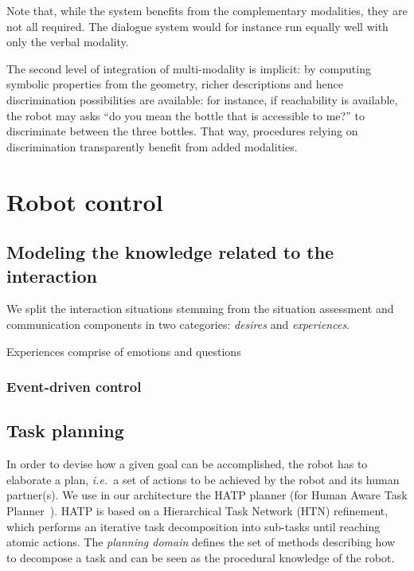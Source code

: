 \documentclass[letterpaper, 10 pt, conference]{ieeeconf}  %
\newcommand{\ie}{{\textit{i.e.\ }}}
\begin{document}
Note that, while the system benefits from the complementary modalities, they
are not all required. The dialogue system would for instance run equally well
with only the verbal modality.

The second level of integration of multi-modality is implicit: by computing
symbolic properties from the geometry, richer descriptions and hence
discrimination possibilities are available: for instance, if reachability is
available, the robot may asks ``do you mean the bottle that is accessible to
me?'' to discriminate between the three bottles. That way, procedures relying
on discrimination transparently benefit from added modalities.

\section{Robot control}
\label{sect|ctrl}

\subsection{Modeling the knowledge related to the interaction}

We split the interaction situations stemming from the situation assessment and
communication components in two categories: \emph{desires} and
\emph{experiences}.

Experiences comprise of emotions and questions

\subsubsection{Event-driven control}

\subsection{Task planning}

In order to devise how a given goal can be accomplished, the robot has to
elaborate a plan, \ie a set of actions to be achieved by the robot and its
human partner(s).  We use in our architecture the HATP planner (for Human Aware
Task Planner~\cite{Alili2009}).  HATP is based on a Hierarchical Task Network
(HTN) refinement, which performs an iterative task decomposition into sub-tasks
until reaching atomic actions.  The \emph{planning domain} defines the set of
methods describing how to decompose a task and can be seen as the procedural
knowledge of the robot.
\end{document}
